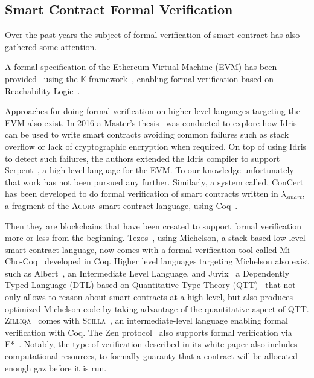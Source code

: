 \documentclass[]{report}
\begin{document}
\subsection{Smart Contract Formal Verification}

Over the past years the subject of formal verification of smart
contract has also gathered some attention.

A formal specification of the Ethereum Virtual Machine (EVM) has been
provided~\cite{Hildenbrandt2018} using the $\mathbb{K}$
framework~\cite{Xiaohong2019}, enabling formal verification based on
Reachability Logic~\cite{Alechina2000}.

Approaches for doing formal verification on higher level languages
targeting the EVM also exist.  In 2016 a Master's
thesis~\cite{Pettersson2016} was conducted to explore how Idris can be
used to write smart contracts avoiding common failures such as stack
overflow or lack of cryptographic encryption when required.  On top of
using Idris to detect such failures, the authors extended the Idris
compiler to support Serpent~\cite{Delmolino2015}, a high level
language for the EVM.  To our knowledge unfortunately that work has
not been pursued any further.  Similarly, a system called,
ConCert~\cite{Annenkov2020} has been developed to do formal
verification of smart contracts written in $\lambda_{smart}$, a
fragment of the \textsc{Acorn} smart contract language, using
Coq~\cite{Bertot2004}.

Then they are blockchains that have been created to support formal
verification more or less from the beginning.  Tezos~\cite{Tezos2014},
using Michelson, a stack-based low level smart contract language, now
comes with a formal verification tool called
Mi-Cho-Coq~\cite{Bernardo2019} developed in Coq.  Higher level
languages targeting Michelson also exist such as
Albert~\cite{Bernardo2020}, an Intermediate Level Language, and
Juvix~\cite{Goes2020} a Dependently Typed Language (DTL) based on
Quantitative Type Theory (QTT)~\cite{Atkey2018} that not only allows
to reason about smart contracts at a high level, but also produces
optimized Michelson code by taking advantage of the quantitative
aspect of QTT.  \textsc{Zilliqa}~\cite{Zilliqa2017} comes with
\textsc{Scilla}~\cite{Ilya2018}, an intermediate-level language
enabling formal verification with Coq.  The Zen
protocol~\cite{Zen2017} also supports formal verification via
F*~\cite{Swamy2013}.  Notably, the type of verification described in
its white paper also includes computational resources, to formally
guaranty that a contract will be allocated enough gaz before it is
run.
\end{document}
